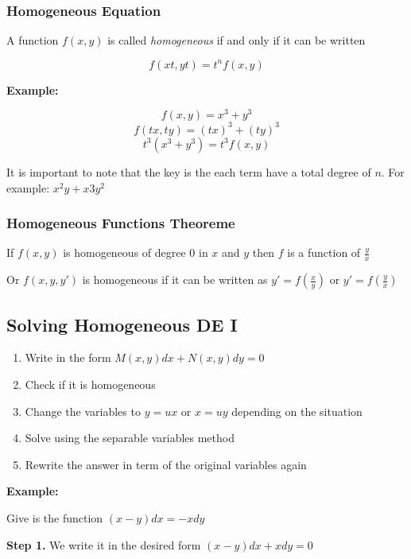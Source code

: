 \subsubsection{Homogeneous Equation}

A function \(f(x,y)\) is called \emph{homogeneous} if and only if it can be written

\[f(xt, yt) = t^n f(x,y)\]

\textbf{Example: }

\[f(x,y) = x^3 + y^3\]
\[f(tx, ty) = {(tx)}^3 + {(ty)}^3\]
\[t^3 (x^3 + y^3) = t^3 f(x,y)\]

It is important to note that the key is the each term have a total degree of \(n\).
For example: \(x^2y + x3y^2\)

\subsubsection{Homogeneous Functions Theoreme}

If \(f(x,y)\) is homogeneous of degree \(0\) in \(x\) and \(y\) then 
\(f\) is a function of \(\frac{y}{x}\)

Or \(f(x,y,y')\) is homogeneous if it can be written as \(y' = f(\frac{x}{y})\) or \(y' = f(\frac{y}{x})\)

\subsection{Solving Homogeneous DE I}

\begin{enumerate}
    \item Write in the form \(M(x,y)dx + N(x,y)dy = 0\)
    \item Check if it is homogeneous
    \item Change the variables to \(y = ux\) or \(x = uy\) depending on the situation
    \item Solve using the separable variables method
    \item Rewrite the answer in term of the original variables again
\end{enumerate}

\textbf{Example:}
\vspace{\baselineskip}


Give is the function \((x -y)dx = - xdy\)
\vspace{\baselineskip}

\textbf{Step 1.} We write it in the desired form \((x - y)dx + xdy = 0\)
\vspace{\baselineskip}

